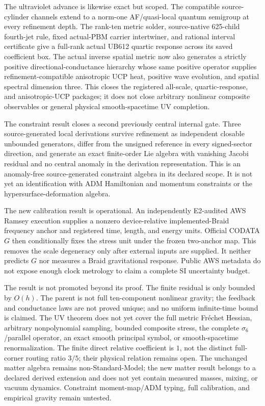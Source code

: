 \documentclass[11pt]{article}
\theoremstyle{definition}
\theoremstyle{remark}
\begin{document}
The ultraviolet advance is likewise exact but scoped. The compatible source-cylinder channels extend to a norm-one AF/quasi-local quantum semigroup at every refinement depth. The rank-ten metric solder, source-native 625-child fourth-jet rule, fixed actual-PBM carrier intertwiner, and rational interval certificate give a full-rank actual UB612 quartic response across its saved coefficient box. The actual inverse spatial metric now also generates a strictly positive directional-conductance hierarchy whose same positive operator supplies refinement-compatible anisotropic UCP heat, positive wave evolution, and spatial spectral dimension three. This closes the registered all-scale, quartic-response, and anisotropic-UCP packages; it does not close arbitrary nonlinear composite observables or general physical smooth-spacetime UV completion.

The constraint result closes a second previously central internal gate. Three source-generated local derivations survive refinement as independent closable unbounded generators, differ from the unsigned reference in every signed-sector direction, and generate an exact finite-order Lie algebra with vanishing Jacobi residual and no central anomaly in the derivation representation. This is an anomaly-free source-generated constraint algebra in its declared scope. It is not yet an identification with ADM Hamiltonian and momentum constraints or the hypersurface-deformation algebra.

The new calibration result is operational. An independently E2-audited AWS Ramsey execution supplies a nonzero device-relative implemented-Braid frequency anchor and registered time, length, and energy units. Official CODATA $G$ then conditionally fixes the stress unit under the frozen two-anchor map. This removes the scale degeneracy only after external inputs are supplied. It neither predicts $G$ nor measures a Braid gravitational response. Public AWS metadata do not expose enough clock metrology to claim a complete SI uncertainty budget.

The result is not promoted beyond its proof. The finite residual is only bounded by $O(h)$. The parent is not full ten-component nonlinear gravity; the feedback and conductance laws are not proved unique; and no uniform infinite-time bound is claimed. The UV theorem does not yet cover the full metric Fr\'echet Hessian, arbitrary nonpolynomial sampling, bounded composite stress, the complete $\sigma_6$/parallel operator, an exact smooth principal symbol, or smooth-spacetime renormalization. The finite direct relative coefficient is $1$, not the distinct full-corner routing ratio $3/5$; their physical relation remains open. The unchanged matter algebra remains non-Standard-Model; the new matter result belongs to a declared derived extension and does not yet contain measured masses, mixing, or vacuum dynamics. Constraint moment-map/ADM typing, full calibration, and empirical gravity remain untested.
\end{document}
